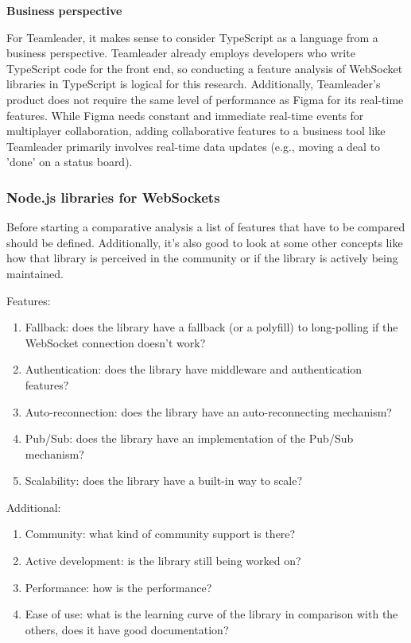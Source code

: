 \textbf{Business perspective}

For Teamleader, it makes sense to consider TypeScript as a language from a business perspective. Teamleader already employs developers who write TypeScript code for the front end, so conducting a feature analysis of WebSocket libraries in TypeScript is logical for this research. Additionally, Teamleader's product does not require the same level of performance as Figma for its real-time features. While Figma needs constant and immediate real-time events for multiplayer collaboration, adding collaborative features to a business tool like Teamleader primarily involves real-time data updates (e.g., moving a deal to 'done' on a status board).

\subsubsection{Node.js libraries for WebSockets}

Before starting a comparative analysis a list of features that have to be compared should be defined. Additionally, it's also good to look at some other concepts like how that library is perceived in the community or if the library is actively being maintained.

Features:

\begin{enumerate}
  \item Fallback: does the library have a fallback (or a polyfill) to long-polling if the WebSocket connection doesn't work?
  \item Authentication: does the library have middleware and authentication features?
  \item Auto-reconnection: does the library have an auto-reconnecting mechanism?
  \item Pub/Sub: does the library have an implementation of the Pub/Sub mechanism?
  \item Scalability: does the library have a built-in way to scale?
\end{enumerate}

Additional:

\begin{enumerate}
  \item Community: what kind of community support is there?
  \item Active development: is the library still being worked on?
  \item Performance: how is the performance?
  \item Ease of use: what is the learning curve of the library in comparison with the others, does it have good documentation?
\end{enumerate}

